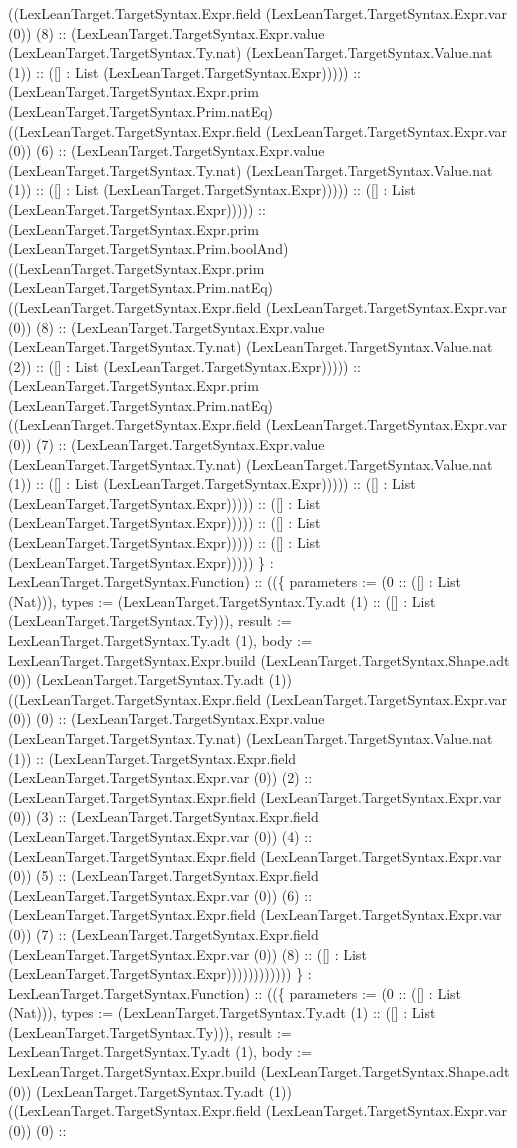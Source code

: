 \documentclass[11pt]{article}
\begin{document}
((LexLeanTarget.TargetSyntax.Expr.field (LexLeanTarget.TargetSyntax.Expr.var (0)) (8) :: (LexLeanTarget.TargetSyntax.Expr.value (LexLeanTarget.TargetSyntax.Ty.nat) (LexLeanTarget.TargetSyntax.Value.nat (1)) :: ([] : List (LexLeanTarget.TargetSyntax.Expr))))) :: (LexLeanTarget.TargetSyntax.Expr.prim (LexLeanTarget.TargetSyntax.Prim.natEq) ((LexLeanTarget.TargetSyntax.Expr.field (LexLeanTarget.TargetSyntax.Expr.var (0)) (6) :: (LexLeanTarget.TargetSyntax.Expr.value (LexLeanTarget.TargetSyntax.Ty.nat) (LexLeanTarget.TargetSyntax.Value.nat (1)) :: ([] : List (LexLeanTarget.TargetSyntax.Expr))))) :: ([] : List (LexLeanTarget.TargetSyntax.Expr))))) :: (LexLeanTarget.TargetSyntax.Expr.prim (LexLeanTarget.TargetSyntax.Prim.boolAnd) ((LexLeanTarget.TargetSyntax.Expr.prim (LexLeanTarget.TargetSyntax.Prim.natEq) ((LexLeanTarget.TargetSyntax.Expr.field (LexLeanTarget.TargetSyntax.Expr.var (0)) (8) :: (LexLeanTarget.TargetSyntax.Expr.value (LexLeanTarget.TargetSyntax.Ty.nat) (LexLeanTarget.TargetSyntax.Value.nat (2)) :: ([] : List (LexLeanTarget.TargetSyntax.Expr))))) :: (LexLeanTarget.TargetSyntax.Expr.prim (LexLeanTarget.TargetSyntax.Prim.natEq) ((LexLeanTarget.TargetSyntax.Expr.field (LexLeanTarget.TargetSyntax.Expr.var (0)) (7) :: (LexLeanTarget.TargetSyntax.Expr.value (LexLeanTarget.TargetSyntax.Ty.nat) (LexLeanTarget.TargetSyntax.Value.nat (1)) :: ([] : List (LexLeanTarget.TargetSyntax.Expr))))) :: ([] : List (LexLeanTarget.TargetSyntax.Expr))))) :: ([] : List (LexLeanTarget.TargetSyntax.Expr))))) :: ([] : List (LexLeanTarget.TargetSyntax.Expr))))) :: ([] : List (LexLeanTarget.TargetSyntax.Expr))))) \} : LexLeanTarget.TargetSyntax.Function) :: ((\{ parameters := (0 :: ([] : List (Nat))), types := (LexLeanTarget.TargetSyntax.Ty.adt (1) :: ([] : List (LexLeanTarget.TargetSyntax.Ty))), result := LexLeanTarget.TargetSyntax.Ty.adt (1), body := LexLeanTarget.TargetSyntax.Expr.build (LexLeanTarget.TargetSyntax.Shape.adt (0)) (LexLeanTarget.TargetSyntax.Ty.adt (1)) ((LexLeanTarget.TargetSyntax.Expr.field (LexLeanTarget.TargetSyntax.Expr.var (0)) (0) :: (LexLeanTarget.TargetSyntax.Expr.value (LexLeanTarget.TargetSyntax.Ty.nat) (LexLeanTarget.TargetSyntax.Value.nat (1)) :: (LexLeanTarget.TargetSyntax.Expr.field (LexLeanTarget.TargetSyntax.Expr.var (0)) (2) :: (LexLeanTarget.TargetSyntax.Expr.field (LexLeanTarget.TargetSyntax.Expr.var (0)) (3) :: (LexLeanTarget.TargetSyntax.Expr.field (LexLeanTarget.TargetSyntax.Expr.var (0)) (4) :: (LexLeanTarget.TargetSyntax.Expr.field (LexLeanTarget.TargetSyntax.Expr.var (0)) (5) :: (LexLeanTarget.TargetSyntax.Expr.field (LexLeanTarget.TargetSyntax.Expr.var (0)) (6) :: (LexLeanTarget.TargetSyntax.Expr.field (LexLeanTarget.TargetSyntax.Expr.var (0)) (7) :: (LexLeanTarget.TargetSyntax.Expr.field (LexLeanTarget.TargetSyntax.Expr.var (0)) (8) :: ([] : List (LexLeanTarget.TargetSyntax.Expr)))))))))))) \} : LexLeanTarget.TargetSyntax.Function) :: ((\{ parameters := (0 :: ([] : List (Nat))), types := (LexLeanTarget.TargetSyntax.Ty.adt (1) :: ([] : List (LexLeanTarget.TargetSyntax.Ty))), result := LexLeanTarget.TargetSyntax.Ty.adt (1), body := LexLeanTarget.TargetSyntax.Expr.build (LexLeanTarget.TargetSyntax.Shape.adt (0)) (LexLeanTarget.TargetSyntax.Ty.adt (1)) ((LexLeanTarget.TargetSyntax.Expr.field (LexLeanTarget.TargetSyntax.Expr.var (0)) (0) :: 
\end{document}
